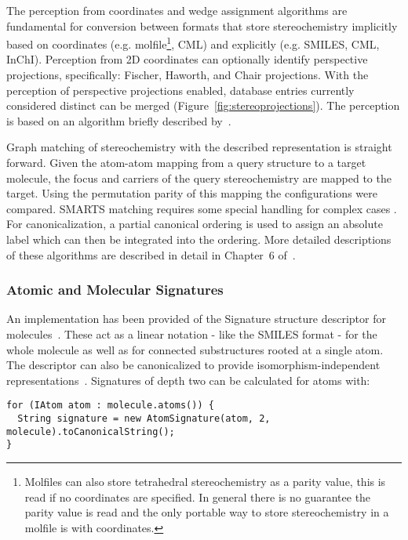 \documentclass[doublespacing]{bmcart}
\begin{document}
  The perception from coordinates and wedge assignment algorithms are fundamental for conversion
  between formats that store stereochemistry implicitly based on coordinates (e.g. molfile\footnote{Molfiles 
  can also store tetrahedral stereochemistry as a parity value, this is read if no coordinates are specified.
  In general there is no guarantee the parity value is read and the only portable way to store
  stereochemistry in a molfile is with coordinates.}, CML) and 
  explicitly (e.g. SMILES, CML, InChI). Perception from 2D coordinates 
  can optionally identify
  perspective projections, specifically: Fischer, Haworth, and Chair projections. With the perception of 
  perspective projections enabled, database entries currently considered distinct can be merged
  (Figure~\ref{fig:stereoprojections}).  The perception is based on an  algorithm briefly  
  described by~\cite{Karapetyan2015}.


  Graph matching of stereochemistry with the described representation is straight forward. Given
  the atom-atom mapping from a query structure to a target molecule, the focus and carriers of 
  the query stereochemistry are mapped to the target. Using the permutation parity of this mapping
  the configurations were compared. SMARTS matching requires some special handling for complex cases 
  \cite{May2014_SMARTS}. For canonicalization, a partial canonical ordering is used to assign an 
  absolute label which can then be integrated into the ordering. More detailed descriptions of 
  these algorithms are described in detail in Chapter~6 of~\cite{May2015}.

  \subsubsection*{Atomic and Molecular Signatures}

  An implementation has been provided of the Signature structure descriptor for
  molecules~\cite{Faulon2003}. These act as a linear notation - like the SMILES format - 
  for the whole molecule as well as for connected substructures rooted at a single atom. The 
  descriptor can also be canonicalized to provide isomorphism-independent
  representations~\cite{Faulon2004}. Signatures of depth two can be calculated
  for atoms with:

\vspace{0.2cm}
\begin{verbatim}
for (IAtom atom : molecule.atoms()) {
  String signature = new AtomSignature(atom, 2, molecule).toCanonicalString();
}
\end{verbatim}
\vspace{0.2cm}
\end{document}
